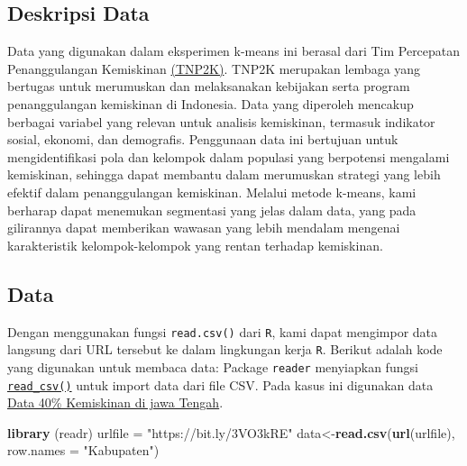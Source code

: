 \documentclass[
  oneside]{book}
\newenvironment{Shaded}{\begin{snugshade}}{\end{snugshade}}
\newcommand{\AttributeTok}[1]{\textcolor[rgb]{0.13,0.29,0.53}{#1}}
\newcommand{\FunctionTok}[1]{\textcolor[rgb]{0.13,0.29,0.53}{\textbf{#1}}}
\newcommand{\NormalTok}[1]{#1}
\newcommand{\OtherTok}[1]{\textcolor[rgb]{0.56,0.35,0.01}{#1}}
\newcommand{\StringTok}[1]{\textcolor[rgb]{0.31,0.60,0.02}{#1}}
\begin{document}
\subsection*{Deskripsi Data}\label{deskripsi-data}

Data yang digunakan dalam eksperimen k-means ini berasal dari Tim Percepatan Penanggulangan Kemiskinan \href{https://www.tnp2k.go.id/}{(TNP2K)}. TNP2K merupakan lembaga yang bertugas untuk merumuskan dan melaksanakan kebijakan serta program penanggulangan kemiskinan di Indonesia. Data yang diperoleh mencakup berbagai variabel yang relevan untuk analisis kemiskinan, termasuk indikator sosial, ekonomi, dan demografis. Penggunaan data ini bertujuan untuk mengidentifikasi pola dan kelompok dalam populasi yang berpotensi mengalami kemiskinan, sehingga dapat membantu dalam merumuskan strategi yang lebih efektif dalam penanggulangan kemiskinan. Melalui metode k-means, kami berharap dapat menemukan segmentasi yang jelas dalam data, yang pada gilirannya dapat memberikan wawasan yang lebih mendalam mengenai karakteristik kelompok-kelompok yang rentan terhadap kemiskinan.

\subsection*{Data}\label{data}

Dengan menggunakan fungsi \texttt{read.csv()} dari \texttt{R}, kami dapat mengimpor data langsung dari URL tersebut ke dalam lingkungan kerja \texttt{R}. Berikut adalah kode yang digunakan untuk membaca data:
Package \texttt{reader} menyiapkan fungsi \href{https://readr.tidyverse.org/reference/read_delim.html}{\texttt{read\_csv()}} untuk import data dari file CSV. Pada kasus ini digunakan data \href{https://github.com/dedenistiawan/Dataset/blob/main/BDT.csv}{Data 40\% Kemiskinan di jawa Tengah}.

\begin{Shaded}
\begin{Highlighting}[]
\FunctionTok{library}\NormalTok{ (readr)}
\NormalTok{urlfile }\OtherTok{=} \StringTok{"https://bit.ly/3VO3kRE"}
\NormalTok{data}\OtherTok{\textless{}{-}}\FunctionTok{read.csv}\NormalTok{(}\FunctionTok{url}\NormalTok{(urlfile), }\AttributeTok{row.names =} \StringTok{"Kabupaten"}\NormalTok{)}
\end{Highlighting}
\end{Shaded}
\end{document}
